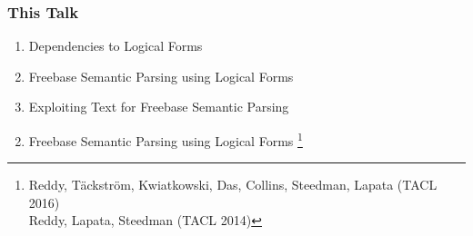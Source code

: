 \documentclass[mathserif,12pt]{beamer}
\newcommand\blfootnote[1]{%
  \begingroup
  \renewcommand\thefootnote{}\footnote{#1}%
  \addtocounter{footnote}{-1}%
  \endgroup
}
\begin{document}
\begin{frame}
\frametitle{This Talk}
\large 
\begin{enumerate}
 \item Dependencies to Logical Forms
 
 \vspace{2em}
 \item Freebase Semantic Parsing using Logical Forms
 
 \vspace{2em}
 \item Exploiting Text for Freebase Semantic Parsing
\end{enumerate}
\end{frame}

\begin{frame}
\Large
\centering
\vspace{1.5em}
\begin{enumerate}
 \setcounter{enumi}{1}
 \item Freebase Semantic Parsing using Logical Forms \blfootnote{\color{blue} Reddy, T\"ackstr\"om, Kwiatkowski, Das, Collins, Steedman, Lapata (TACL 2016)\\
   \hspace{1.8em}Reddy, Lapata, Steedman (TACL 2014)}
\end{enumerate}
\end{frame}
\end{document}
